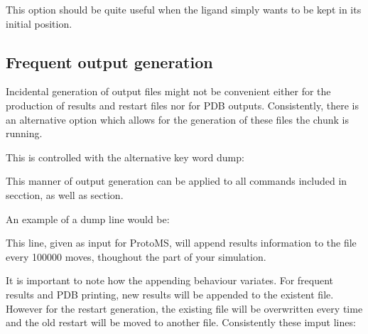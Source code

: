 \documentclass[letterpaper,10pt,english]{sphinxmanual}
\begin{document}
This option should be quite useful when the ligand simply wants to be kept in its initial position.


\subsection{Frequent output generation}
\label{\detokenize{protoms:frequent-output-generation}}
Incidental generation of output files might not be convenient either for the production of results and restart files nor for PDB outputs. Consistently, there is an alternative option which allows for the generation of these files  the  chunk is running.

\ignorespaces 
This is controlled with the alternative key word dump:

%
\begin{sphinxVerbatim}[commandchars=\\\{\}]
  
\end{sphinxVerbatim}

This manner of output generation can be applied to all commands included in {\hyperref[\detokenize{protoms:results-and-restarts}]{}} secction, as well as {\hyperref[\detokenize{protoms:pdb-output}]{}} section.

An example of a dump line would be:

%
\begin{sphinxVerbatim}[commandchars=\\\{\}]
    
\end{sphinxVerbatim}

This line, given as input for ProtoMS, will append results information to the  file every 100000 moves, thoughout the  part of your simulation.

It is important to note how the appending behaviour variates. For frequent results and PDB printing, new results will be appended to the existent file. However for the restart generation, the existing file will be overwritten every time and the old restart will be moved to another file. Consistently these imput lines:

%
\begin{sphinxVerbatim}[commandchars=\\\{\}]
    
    
    
   
     
\end{sphinxVerbatim}
\end{document}
